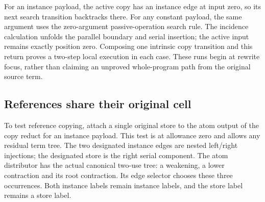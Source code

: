 



For an instance payload, the active copy has an instance edge at input zero,
so its next search transition backtracks there. For any constant payload,
the same argument uses the zero-argument passive-operation search rule.
The incidence calculation unfolds the parallel boundary and serial insertion;
the active input remains exactly position zero. Composing one intrinsic
copy transition and this return proves a two-step local execution in each
case. These runs begin at rewrite focus, rather than claiming an unproved
whole-program path from the original source term.





\subsection{References share their original cell}

To test reference copying, attach a single original store to the atom output
of the copy reduct for an instance payload. This test is at allowance zero
and allows any residual term tree. The two designated instance edges are
nested left/right injections; the designated store is the right serial
component. The atom distributor has the actual canonical two-use tree:
a weakening, a lower contraction and its root contraction. Its edge selector
chooses these three occurrences. Both instance labels remain instance labels,
and the store label remains a store label.




